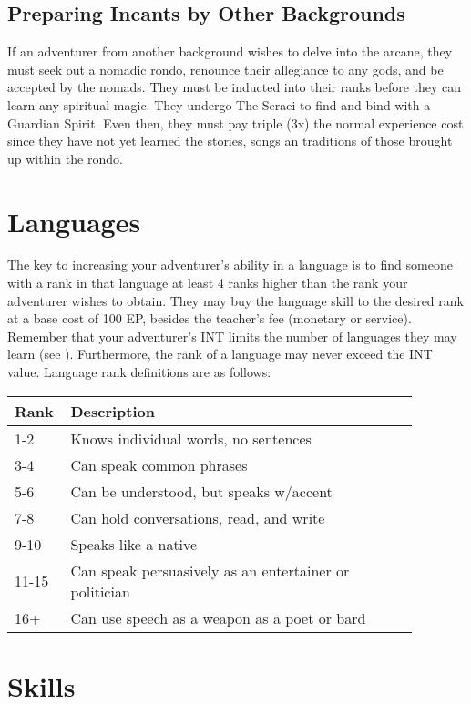 \subsection{Preparing Incants by Other Backgrounds}

If an adventurer from another background wishes to delve into the arcane, they must seek out a nomadic rondo, renounce their allegiance to any gods, and be accepted by the nomads. They must be inducted into their ranks before they can learn any spiritual magic. They undergo The Seraei to find and bind with a Guardian Spirit. Even then, they must pay triple (3x) the normal experience cost since they have not yet learned the stories, songs an traditions of those brought up within the rondo.

\section{Languages}
The key to increasing your adventurer's ability in a language is to find someone with a rank in that language at least 4 ranks higher than the rank your adventurer wishes to obtain. They may buy the language skill to the desired rank at a base cost of 100 EP, besides the teacher's fee (monetary or service). Remember that your adventurer's INT limits the number of languages they may learn (see ). Furthermore, the rank of a language may never exceed the INT value. Language rank definitions are as follows:

\begin{normbox}

\small
\begin{tabular}{@{}p{0.085\linewidth} p{0.8\linewidth}}
\textbf{Rank} & \textbf{Description}\\
\midrule
1-2  & Knows individual words, no sentences\\
3-4  & Can speak common phrases\\
5-6  & Can be understood, but speaks w/accent\\
7-8  & Can hold conversations, read, and write\\
9-10  & Speaks like a native\\
11-15  & Can speak persuasively as an entertainer or politician\\
16+ & Can use speech as a weapon as a poet or bard
\end{tabular}
\end{normbox}

\section{Skills}

